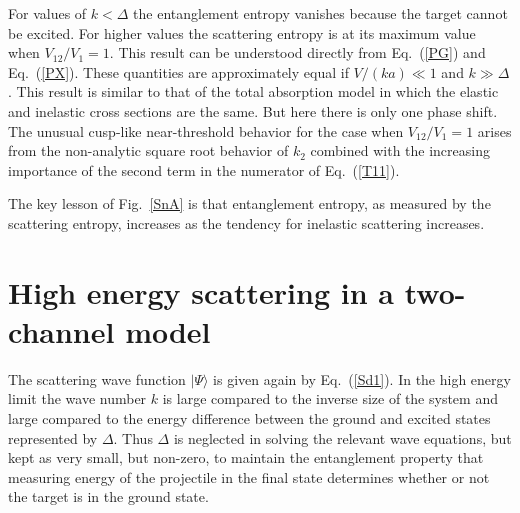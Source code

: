 \documentclass[prl,twocolumn,longbibliography,letterpaper,showpacs,groupedaddress,superscriptaddress,nofootinbib,floatfix,preprintnumbers,tightenlines]{revtex4-1}
\let\Oldsection\section
\renewcommand{\section}{\FloatBarrier\Oldsection}
\newcommand{\eq}[1]{Eq.~(\ref{#1})}
\def\D{\Delta}
\def\ra{\rangle}\def\la{\langle}
\begin{document}
For values of $k<\D$ the entanglement  entropy vanishes because the target cannot be excited. For higher values 
the scattering entropy is  at its maximum value when  $V_{12}/V_1=1$. This result  can be understood directly from \eq{PG} and \eq{PX}.  These quantities are approximately equal if $V/(ka)\ll1$ and $k\gg\D$. This result is similar to that of the total absorption  model in which the elastic and inelastic cross sections are the same. But here there is only one phase shift.  The unusual cusp-like near-threshold behavior for the case when $V_{12}/V_1=1$ arises  from the non-analytic square root behavior of $k_2$ combined with the increasing importance of the second term in the numerator of \eq{T11}.

The key  lesson of Fig.~\ref{SnA} is that entanglement entropy, as measured by the scattering entropy, increases as the tendency for inelastic scattering increases.



  
  
  
  \section{High energy scattering in a two-channel model}
 The scattering wave function $|\Psi\ra$ is given again by \eq{Sd1}.
In the high energy limit
the wave number $k$ is large compared to the inverse size of the system and large compared to the energy difference between the ground and excited states represented by $\D$. Thus
 $\D$ is neglected in solving the relevant wave equations, but kept  as very small, but non-zero, to  maintain the entanglement property that measuring energy of the projectile in the final state determines whether or not the target is in the ground state.  

\end{document}
